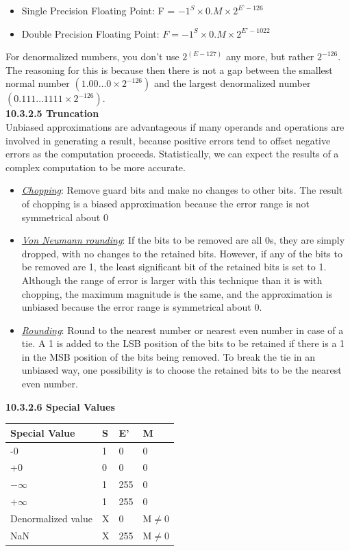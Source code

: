 \documentclass[10pt]{article}
\begin{document}
\begin{itemize}
    \item Single Precision Floating Point: F = $-1^S × 0.M × 2^{E’-126}$
    \item Double Precision Floating Point: $F = -1^S × 0.M × 2^{E’-1022}$
\end{itemize}
For denormalized numbers, you don't use $2^{(E - 127)}$ any more, but rather $2^{-126}$. The reasoning for this is because then there is not a gap between the smallest normal number $(1.00\dots0 \times 2^{-126})$ and the largest denormalized number $(0.111\dots1111 \times 2^{-126})$.\\

\textbf{10.3.2.5 Truncation}\\
Unbiased approximations are advantageous if many operands and operations are involved in generating a result, because positive errors tend to offset negative errors as the computation proceeds. Statistically, we can expect the results of a complex computation to be more accurate.
\begin{itemize}
    \item \underline{\textit{Chopping}}: Remove guard bits and make no changes to other bits. The result of chopping is a biased approximation because the error range is not symmetrical about 0
    \item \underline{\textit{Von Neumann rounding}}: If the bits to be removed are all 0s, they are simply dropped, with no changes to the retained bits. However, if any of the bits to be removed are 1, the least significant bit of the retained bits is set to 1. Although the range of error is larger with this technique than it is with chopping, the maximum magnitude is the same, and the approximation is unbiased because the error range is symmetrical about 0.
    \item \underline{\textit{Rounding}}: Round to the nearest number or nearest even number in case of a tie. A 1 is added to the LSB position of the bits to be retained if there is a 1 in the MSB position of the bits being removed. To break the tie in an unbiased way, one possibility is to choose the retained bits to be the nearest even number.\\
\end{itemize}

\textbf{10.3.2.6 Special Values}
\begin{table}[h!]
\begin{tabular}{l|l|l|l}
\hline
Special Value & S & E' & M \\ \hline
-0 & 1 & 0 & 0 \\
+0 & 0 & 0 & 0 \\
$-\infty$ & 1 & 255 & 0 \\
$+\infty$ & 1 & 255 & 0 \\
Denormalized value & X & 0 & M$\neq$0 \\
NaN & X & 255 & M$\neq$0
\end{tabular}
\end{table}
\end{document}
